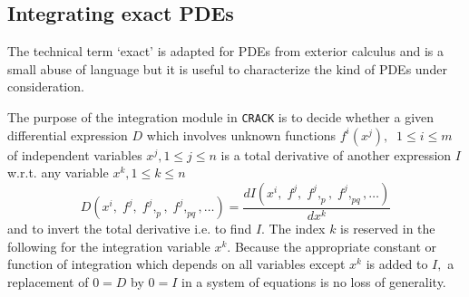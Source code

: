\subsection{Integrating exact PDEs}
The technical term `exact' is adapted for PDEs from exterior calculus and
is a small abuse of language but it is useful to characterize the kind of PDEs
under consideration.

The purpose of the integration module in {\tt CRACK} is to  decide
whether a given differential
expression $D$ which involves unknown functions $f^i(x^j),\;\; 1\leq i\leq m$
of independent variables $x^j, 1\leq j\leq n$
is a total derivative of another expression $I$
w.r.t. any variable $x^k, 1\leq k\leq n$
\[ D(x^i,\; f^j,\; f^j,_p,\; f^j,_{pq}, \ldots)
     = \frac{d I(x^i,\; f^j,\; f^j,_p,\; f^j,_{pq}, \ldots)}{d x^k} \]
and to invert the total derivative i.e. to find $I.$ The index $k$ is
reserved in the following for the integration variable $x^k.$ Because
the appropriate constant or function of integration which depends on
all variables except $x^k$ is added to $I,$ a replacement of $0 = D$
by $0 = I$ in a system of equations is no loss of generality.

